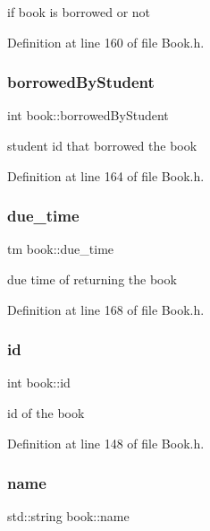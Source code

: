 if book is borrowed or not 

Definition at line 160 of file Book.\+h.

\mbox{\label{classbook_afa5350900be6a34d8301a57d6db54df5}} 
\subsubsection{\texorpdfstring{borrowed\+By\+Student}{borrowedByStudent}}
{\footnotesize\ttfamily int book\+::borrowed\+By\+Student\hspace{0.3cm}{\ttfamily [private]}}

student id that borrowed the book 

Definition at line 164 of file Book.\+h.

\mbox{\label{classbook_abf72d9a32cdadee632df5a626dbe33b8}} 
\subsubsection{\texorpdfstring{due\+\_\+time}{due\_time}}
{\footnotesize\ttfamily tm book\+::due\+\_\+time\hspace{0.3cm}{\ttfamily [private]}}

due time of returning the book 

Definition at line 168 of file Book.\+h.

\mbox{\label{classbook_ad8bf54b50c72af3827823c04d724d824}} 
\subsubsection{\texorpdfstring{id}{id}}
{\footnotesize\ttfamily int book\+::id\hspace{0.3cm}{\ttfamily [private]}}

id of the book 

Definition at line 148 of file Book.\+h.

\mbox{\label{classbook_a5eabc1c1c5abff26997bec3d41f90d9e}} 
\subsubsection{\texorpdfstring{name}{name}}
{\footnotesize\ttfamily std\+::string book\+::name\hspace{0.3cm}{\ttfamily [private]}}

